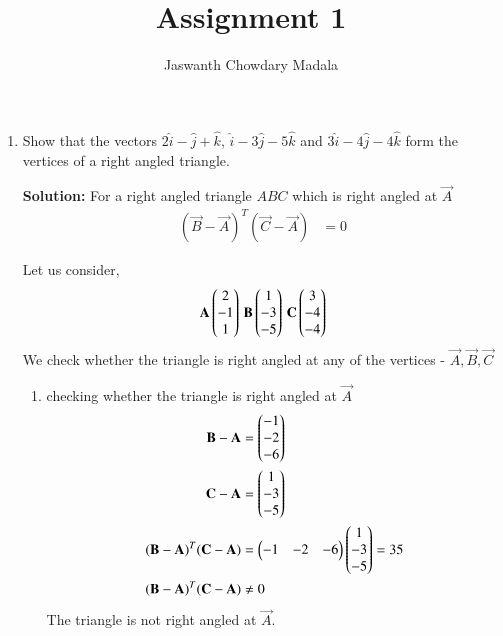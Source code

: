 \documentclass[journal,12pt,twocolumn]{IEEEtran}
\begin{document}
\vspace{3cm}


\title{Assignment 1}
\author{Jaswanth Chowdary Madala}





\maketitle

\newpage


\bigskip

\renewcommand{\thefigure}{\theenumi}
\renewcommand{\thetable}{\theenumi}


\begin{enumerate}

\item Show that the vectors $2\hat{i}-\hat{j}+\hat{k}$, $\hat{i}-3\hat{j}-5\hat{k}$ and $3\hat{i}-4\hat{j}-4\hat{k}$ form the vertices of a right angled triangle.

\textbf{Solution:} For a right angled triangle $ABC$ which is right angled at $\vec{A}$ 
\begin{align}
{(\vec{B}-\vec{A})}^{T}{(\vec{C}-\vec{A})} &= 0
\end{align}

Let us consider, 
\begin{align}
\mathbf{A}\begin{pmatrix}2\\-1\\1\end{pmatrix} \, \mathbf{B}\begin{pmatrix}1\\-3\\-5\end{pmatrix} \, \mathbf{C}\begin{pmatrix}3\\-4\\-4\end{pmatrix} 
\end{align}
We check whether the triangle is right angled at any of the vertices -
$ \vec{A}, \vec{B}, \vec{C}$
 
\begin{enumerate}
\item checking whether the triangle is right angled at $\vec{A}$
\begin{align}
\mathbf{B}-\mathbf{A} &= \begin{pmatrix}-1\\-2\\-6\end{pmatrix} \\
\mathbf{C}-\mathbf{A} &= \begin{pmatrix}1\\-3\\-5\end{pmatrix} \\
{(\mathbf{B}-\mathbf{A})}^{T}{(\mathbf{C}-\mathbf{A})} &= \begin{pmatrix}-1&-2&-6\end{pmatrix}\begin{pmatrix}1\\-3\\-5\end{pmatrix} = 35\\
{(\mathbf{B}-\mathbf{A})}^{T}{(\mathbf{C}-\mathbf{A})} &\neq 0
\end{align}
The triangle is not right angled at $\vec{A}$.\\


\end{enumerate}
\end{enumerate}
\end{document}
